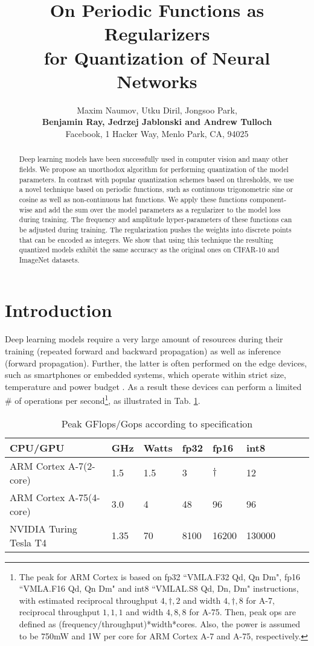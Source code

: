 \documentclass{article}
\title{On Periodic Functions as Regularizers \\ for Quantization of Neural Networks}
\author{Maxim Naumov, Utku Diril, Jongsoo Park, \\ \textbf{Benjamin Ray, Jedrzej Jablonski and Andrew Tulloch} \\ Facebook, 1 Hacker Way, Menlo Park, CA, 94025}
\begin{document}
\maketitle

\begin{abstract}
Deep learning models have been successfully used in computer vision and many other fields. We propose an unorthodox algorithm for performing quantization of the model parameters. In contrast with popular quantization schemes based on thresholds, we use a novel technique based on periodic functions, such as continuous trigonometric sine or cosine as well as non-continuous hat functions. We apply these functions component-wise and add the sum over the model parameters as a regularizer to the model loss during training. The frequency and amplitude hyper-parameters of these functions can be adjusted during training. The regularization pushes the weights into discrete points that can be encoded as integers. We show that using this technique the resulting quantized models exhibit the same accuracy as the original ones on CIFAR-10 and ImageNet datasets.
\end{abstract}


\section{Introduction}

Deep learning models require a very large amount of resources during their training (repeated forward and backward propagation) as well as inference (forward propagation). Further, the latter is often performed on the edge devices, such as smartphones or embedded systems, which operate within strict size, temperature and power budget \cite{Shimpi2011,Humrick2017,Dolbeau2018,Turing2018}. As a result these devices can perform a limited \# of operations per second\footnote{The peak for ARM Cortex is based on fp32 ``VMLA.F32 Qd, Qn Dm", fp16 ``VMLA.F16 Qd, Qn Dm" and int8 ``VMLAL.S8 Qd, Dn, Dm" instructions, with estimated reciprocal throughput $4,\dagger,2$ and width $4,\dagger,8$ for A-7, reciprocal throughput $1,1,1$ and width $4,8,8$ for A-75. Then, peak ops are defined as (frequency/throughput)*width*cores. Also, the power is assumed to be 750mW and 1W per core for ARM Cortex A-7 and A-75, respectively.}, as illustrated in Tab. \ref{tab:typical_cpu_gpu_tops}.

\setcounter{figure}{0}
\setcounter{table}{0}

\begin{table}[h]
\centering
\begin{tabular}{l|l|l|l|l|l|l|l|l}
CPU/GPU                & GHz & Watts  & fp32   & fp16      & int8   \\
\hline
ARM Cortex A-7\phantom{5}(2-core)& 1.5   & 1.5  &  3      & $\dagger$ & 12     \\
ARM Cortex A-75(4-core)& 3.0   & 4    &  48     & 96        & 96    \\
NVIDIA Turing Tesla T4 & 1.35  & 70   &  8100   & 16200     & 130000\\
\end{tabular}
\caption{Peak GFlops/Gops according to specification}
\label{tab:typical_cpu_gpu_tops}
\end{table}
\end{document}

